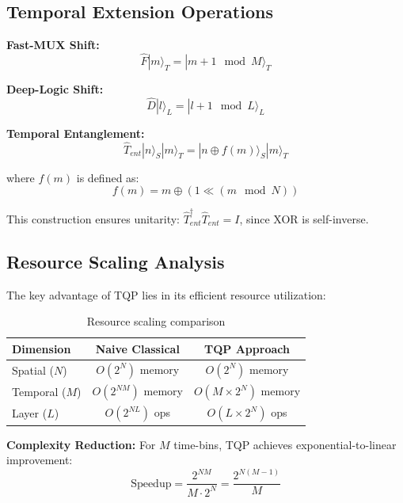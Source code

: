 \documentclass[aps,prx,twocolumn,superscriptaddress,floatfix]{revtex4-2}
\begin{document}
\subsection{Temporal Extension Operations}

\textbf{Fast-MUX Shift:}
\begin{equation}
    \hat{F}|m\rangle_T = |m+1 \mod M\rangle_T
\end{equation}

\textbf{Deep-Logic Shift:}
\begin{equation}
    \hat{D}|l\rangle_L = |l+1 \mod L\rangle_L
\end{equation}

\textbf{Temporal Entanglement:}
\begin{equation}
    \hat{T}_{ent}|n\rangle_S|m\rangle_T = |n \oplus f(m)\rangle_S|m\rangle_T
\end{equation}

where $f(m)$ is defined as:
\begin{equation}
    f(m) = m \oplus (1 \ll (m \mod N))
\end{equation}

This construction ensures unitarity: $\hat{T}_{ent}^\dagger \hat{T}_{ent} = I$, since XOR is self-inverse.

\subsection{Resource Scaling Analysis}

The key advantage of TQP lies in its efficient resource utilization:

\begin{table}[H]
\caption{Resource scaling comparison}
\label{tab:scaling}
\begin{ruledtabular}
\begin{tabular}{lcc}
Dimension & Naive Classical & TQP Approach \\
\hline
Spatial ($N$) & $O(2^N)$ memory & $O(2^N)$ memory \\
Temporal ($M$) & $O(2^{NM})$ memory & $O(M \times 2^N)$ memory \\
Layer ($L$) & $O(2^{NL})$ ops & $O(L \times 2^N)$ ops \\
\end{tabular}
\end{ruledtabular}
\end{table}

\textbf{Complexity Reduction:} For $M$ time-bins, TQP achieves exponential-to-linear improvement:
\begin{equation}
    \text{Speedup} = \frac{2^{NM}}{M \cdot 2^N} = \frac{2^{N(M-1)}}{M}
\end{equation}
\end{document}
